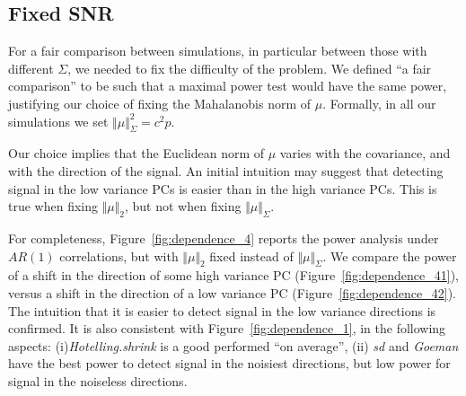 \documentclass[12pt,a4paper]{article}
\begin{document}
\subsection{Fixed SNR}
\label{sec:fix_snr}

For a fair comparison between simulations, in particular between those with different $\Sigma$, we needed to fix the difficulty of the problem.
We defined ``a fair comparison'' to be such that a maximal power test would have the same power, justifying our choice of fixing the Mahalanobis norm of $\mu$. 
Formally, in all our simulations we set $\Vert \mu \Vert_\Sigma^2=c^2 p$.

Our choice implies that the Euclidean norm of $\mu$ varies with the covariance, and with the direction of the signal.
An initial intuition may suggest that detecting signal in the low variance PCs is easier than in the high variance PCs. 
This is true when fixing $\Vert \mu \Vert_2$, but not when fixing $\Vert \mu \Vert_\Sigma$.

For completeness, Figure~\ref{fig:dependence_4} reports the power analysis under $AR(1)$ correlations, but with $\Vert \mu \Vert_2$ fixed instead of $\Vert \mu \Vert_\Sigma$.
We compare the power of a shift in the direction of some high variance PC (Figure~\ref{fig:dependence_41}), versus a shift in the direction of a low variance PC (Figure~\ref{fig:dependence_42}).
The intuition that it is easier to detect signal in the low variance directions is confirmed. 
It is also consistent with Figure~\ref{fig:dependence_1}, in the following aspects: 
(i)\emph{Hotelling.shrink} is a good performed ``on average'', 
(ii) \emph{sd} and \emph{Goeman} have the best power to detect signal in the noisiest directions, but low power for signal in the noiseless directions. 
\end{document}
